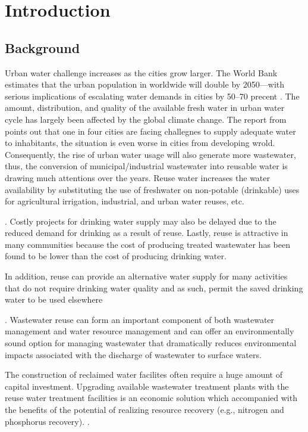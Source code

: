 \chapter{Introduction}
\section{Background}
Urban water challenge increases as the cities grow larger. The World Bank estimates that the urban population in worldwide will double by 2050---with serious implications of escalating water demands in cities by 50--70 precent \citep{theworldbankCircularEconomyOpportunity2021}. The amount, distribution, and quality of the available fresh water in urban water cycle has largely been affected by the global climate change. The report from \citep{unicefURBANWATERSCARCITY2021} points out that one in four cities are facing challegnes to supply adequate water to inhabitants, the situation is even worse in cities from developing wrold. Consequently, the rise of urban water usage will also generate more wastewater, thus, the conversion of municipal/industrial wastewater into reusable water is drawing much attentions over the years. Reuse water increases the water availability by substituting the use of freshwater on non-potable (drinkable) uses for agricultural irrigation, industrial, and urban water reuses, etc. 

. Costly projects for drinking water supply may also be delayed due to the reduced demand for drinking as a result of reuse. Lastly, reuse is attractive in many communities because the cost of producing treated wastewater has been found to be lower than the cost of producing drinking water. 

In addition, reuse can provide an alternative water supply for many activities that do not require drinking water quality and as such, permit the saved drinking water to be used elsewhere

. \citep{adewumiTreatedWastewaterReuse2010}
Wastewater reuse can form an important component of both wastewater management and water resource management and can offer an environmentally sound option for managing wastewater that dramatically reduces environmental impacts associated with the discharge of wastewater to surface waters. 

The construction of reclaimed water facilites often require a huge amount of capital investment. Upgrading available wastewater treatment plants with the reuse water treatment facilities is an economic solution which accompanied with the benefits of the potential of realizing resource recovery (e.g., nitrogen and phosphorus recovery). \citep{maryamWastewaterReclamationReuse2019,kehreinCriticalReviewResource2020}.




